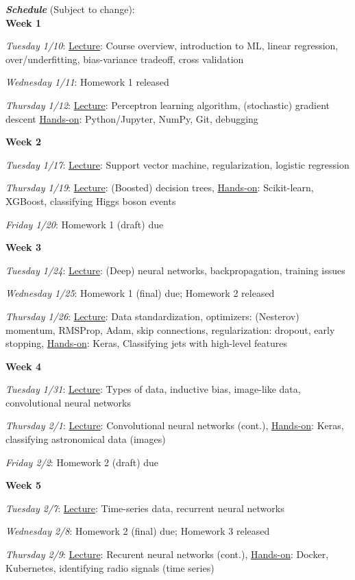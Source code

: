 \documentclass[12pt]{article}
\begin{document}
\noindent\textbf{\emph{Schedule}} (Subject to change):\\

\noindent\textbf{Week 1}

\emph{Tuesday 1/10}: \underline{Lecture}: Course overview, introduction to ML, linear regression, over/underfitting, bias-variance tradeoff, cross validation

\emph{Wednesday 1/11}: Homework 1 released

\emph{Thursday 1/12}: \underline{Lecture}: Perceptron learning algorithm, (stochastic) gradient descent \underline{Hands-on}: Python/Jupyter, NumPy, Git, debugging

\noindent\textbf{Week 2}

\emph{Tuesday 1/17}: \underline{Lecture}: Support vector machine, regularization, logistic regression

\emph{Thursday 1/19}: \underline{Lecture}: (Boosted) decision trees, \underline{Hands-on}: Scikit-learn, XGBoost, classifying Higgs boson events

\emph{Friday 1/20}: Homework 1 (draft) due

\noindent\textbf{Week 3}

\emph{Tuesday 1/24}: \underline{Lecture}: (Deep) neural networks, backpropagation, training issues

\emph{Wednesday 1/25}: Homework 1 (final) due; Homework 2 released

\emph{Thursday 1/26}: \underline{Lecture}: Data standardization, optimizers: (Nesterov) momentum, RMSProp, Adam, skip connections, regularization: dropout, early stopping, \underline{Hands-on}: Keras, Classifying jets with high-level features

\noindent\textbf{Week 4}

\emph{Tuesday 1/31}: \underline{Lecture}: Types of data, inductive bias, image-like data, convolutional neural networks

\emph{Thursday 2/1}: \underline{Lecture}: Convolutional neural networks (cont.), \underline{Hands-on}: Keras, classifying astronomical data (images)

\emph{Friday 2/2}: Homework 2 (draft) due

\noindent\textbf{Week 5}

\emph{Tuesday 2/7}: \underline{Lecture}: Time-series data, recurrent neural networks

\emph{Wednesday 2/8}: Homework 2 (final) due; Homework 3 released

\emph{Thursday 2/9}: \underline{Lecture}: Recurent neural networks (cont.), \underline{Hands-on}: Docker, Kubernetes, identifying radio signals (time series)
\end{document}
